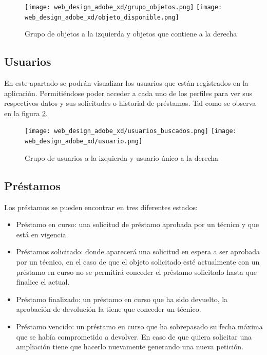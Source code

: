 \begin{figure}[h]
    \centering
    \texttt{[image: web\_design\_adobe\_xd/grupo\_objetos.png]}
    \texttt{[image: web\_design\_adobe\_xd/objeto\_disponible.png]}
    \caption{Grupo de objetos a la izquierda y objetos que contiene a la derecha}\label{grupo_objetos_y_objetos_design}
\end{figure}

\subsection{Usuarios}

En este apartado se podrán visualizar los usuarios que están registrados en la aplicación. Permitiéndose poder acceder a cada uno de los perfiles para ver sus respectivos datos y sus solicitudes o historial de préstamos. Tal como se observa en la figura \ref{grupo_usuarios_design}.

\begin{figure}[h]
    \begin{center}
        \texttt{[image: web\_design\_adobe\_xd/usuarios\_buscados.png]}
        \texttt{[image: web\_design\_adobe\_xd/usuario.png]}
        \caption{Grupo de usuarios a la izquierda y usuario único a la derecha}\label{grupo_usuarios_design}
    \end{center}
\end{figure}

\subsection{Préstamos}

Los préstamos se pueden encontrar en tres diferentes estados:

\begin{itemize}
    \item Préstamo en curso: una solicitud de préstamo aprobada por un técnico y que está en vigencia.
    \item Préstamos solicitado: donde aparecerá una solicitud en espera a ser aprobada por un técnico, en el caso de que el objeto solicitado esté actualmente con un préstamo en curso no se permitirá conceder el préstamo solicitado hasta que finalice el actual.
    \item Préstamo finalizado: un préstamo en curso que ha sido devuelto, la aprobación de devolución la tiene que conceder un técnico.
    \item Préstamo vencido: un préstamo en curso que ha sobrepasado su fecha máxima que se había comprometido a devolver. En caso de que quiera solicitar una ampliación tiene que hacerlo nuevamente generando una nueva petición.
\end{itemize}

